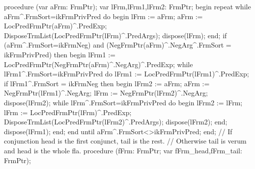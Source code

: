 procedure (var aFrm: FrmPtr);
var
   lFrm,lFrm1,lFrm2: FrmPtr;
begin
   repeat
      while aFrm^.FrmSort=ikFrmPrivPred do
      begin
         lFrm := aFrm;
         aFrm := LocPredFrmPtr(aFrm)^.PredExp;
         DisposeTrmList(LocPredFrmPtr(lFrm)^.PredArgs);
         dispose(lFrm);
      end;
      if (aFrm^.FrmSort=ikFrmNeg) and (NegFrmPtr(aFrm)^.NegArg^.FrmSort = ikFrmPrivPred) then
      begin
         lFrm1 := LocPredFrmPtr(NegFrmPtr(aFrm)^.NegArg)^.PredExp;
         while lFrm1^.FrmSort=ikFrmPrivPred do
            lFrm1 := LocPredFrmPtr(lFrm1)^.PredExp;
         if lFrm1^.FrmSort = ikFrmNeg then
         begin
            lFrm2 := aFrm;
            aFrm := NegFrmPtr(lFrm1)^.NegArg;
            lFrm := NegFrmPtr(lFrm2)^.NegArg;
            dispose(lFrm2);
            while lFrm^.FrmSort=ikFrmPrivPred do
            begin
               lFrm2 := lFrm;
               lFrm := LocPredFrmPtr(lFrm)^.PredExp;
               DisposeTrmList(LocPredFrmPtr(lFrm2)^.PredArgs);
               dispose(lFrm2);
            end;
            dispose(lFrm1);
         end;
      end
   until aFrm^.FrmSort<>ikFrmPrivPred;
end;
\eatline
{}\nwendcode{}\nwdocspar
\nwenddocs{}\endmoddef\nwstartdeflinemarkup{}\nwenddeflinemarkup
// If conjunction head is the first conjunct, tail is the rest.
// Otherwise tail is verum and head is the whole fla.
procedure (fFrm: FrmPtr; var fFrm_head,fFrm_tail: FrmPtr);
